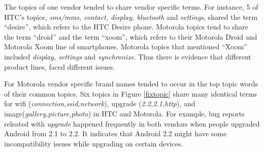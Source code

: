\documentclass[10pt, conference, compsocconf]{IEEEtran}
\begin{document}
The topics of one vendor tended to share vendor specific terms.
For instance, 5 of HTC's topics, \textit{sms\//mms, contact,
  display, bluetooth} and \textit{settings}, shared the term
``desire'', which refers to the HTC Desire phone.
Motorola topics tend to share the term ``droid'' and the term ``xoom'', which refers to their
Motorola Droid and Motorola Xoom line of smartphones.
Motorola topics that mentioned ``Xoom'' included \textit{display,
  settings} and \textit{synchronize}.
Thus there is evidence that different product lines, faced different issues.

For Motorola vendor specific brand names tended to occur in the top
topic words of their common topics.
Six topics in Figure \ref{fixtopic} share many identical terms for
wifi (\textit{connection,ssid,network}), upgrade
(\textit{2.2,2.1,http}), and image(\textit{gallery,picture,photo}) in
HTC and Motorola. For example, bug reports releated with
\textit{upgrade} happened frequently in both vendors when people
upgraded Android from 2.1 to 2.2. It indicates that Android 2.2 might have
some incompatibility issues while upgrading on certain devices.  

\end{document}
